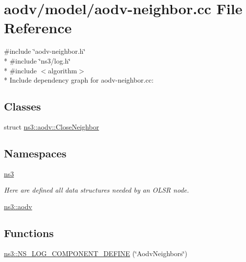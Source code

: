 \hypertarget{aodv-neighbor_8cc}{}\section{aodv/model/aodv-\/neighbor.cc File Reference}
\label{aodv-neighbor_8cc}
{\ttfamily \#include \char`\"{}aodv-\/neighbor.\+h\char`\"{}}\\*
{\ttfamily \#include \char`\"{}ns3/log.\+h\char`\"{}}\\*
{\ttfamily \#include $<$algorithm$>$}\\*
Include dependency graph for aodv-\/neighbor.cc\+:
\subsection*{Classes}
\begin{DoxyCompactItemize}
\item 
struct \hyperlink{structns3_1_1aodv_1_1CloseNeighbor}{ns3\+::aodv\+::\+Close\+Neighbor}
\end{DoxyCompactItemize}
\subsection*{Namespaces}
\begin{DoxyCompactItemize}
\item 
 \hyperlink{namespacens3}{ns3}
\begin{DoxyCompactList}\small\item\em Here are defined all data structures needed by an O\+L\+SR node. \end{DoxyCompactList}\item 
 \hyperlink{namespacens3_1_1aodv}{ns3\+::aodv}
\end{DoxyCompactItemize}
\subsection*{Functions}
\begin{DoxyCompactItemize}
\item 
\hyperlink{namespacens3_a3ed6620a1cf884ade91e97045612d098}{ns3\+::\+N\+S\+\_\+\+L\+O\+G\+\_\+\+C\+O\+M\+P\+O\+N\+E\+N\+T\+\_\+\+D\+E\+F\+I\+NE} (\char`\"{}Aodv\+Neighbors\char`\"{})
\end{DoxyCompactItemize}
